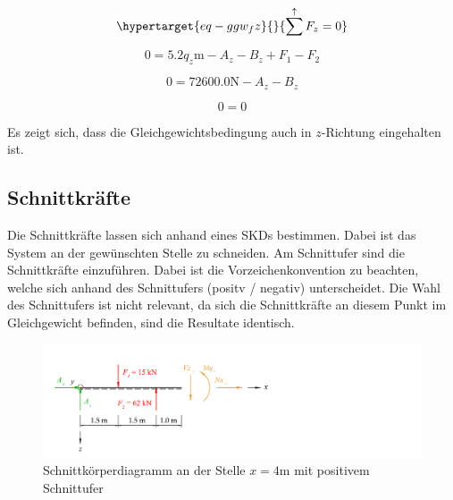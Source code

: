 \documentclass[
  12pt,
  letterpaper,
  DIV=11,
  egregdoesnotlikesansseriftitles]{scrartcl}
\begin{document}
\begin{equation}\protect\hypertarget{eq-ggw_fz}{}{
\sum^\uparrow F_z = 0
}\label{eq-ggw_fz}\end{equation}

\begin{equation}0 = 5.2 q_{z} \text{m} - A_{z} - B_{z} + F_{1} - F_{2}\end{equation}

\begin{equation}0 = 72600.0 \text{N} - A_{z} - B_{z}\end{equation}

\begin{equation}0 = 0\end{equation}

Es zeigt sich, dass die Gleichgewichtsbedingung auch in \(z\)-Richtung
eingehalten ist.

\hypertarget{schnittkruxe4fte}{%
\subsection{Schnittkräfte}\label{schnittkruxe4fte}}

Die Schnittkräfte lassen sich anhand eines SKDs bestimmen. Dabei ist das
System an der gewünschten Stelle zu schneiden. Am Schnittufer sind die
Schnittkräfte einzuführen. Dabei ist die Vorzeichenkonvention zu
beachten, welche sich anhand des Schnittufers (positv / negativ)
unterscheidet. Die Wahl des Schnittufers ist nicht relevant, da sich die
Schnittkräfte an diesem Punkt im Gleichgewicht befinden, sind die
Resultate identisch.

\begin{figure}[H]

{\centering \includegraphics{BSI_HS23_Testat_01_files/mediabag/../images/Testat_01_HS23_SKD_1.pdf}

}

\caption{\label{fig-skd_4_pos}Schnittkörperdiagramm an der Stelle
\(x=4\)m mit positivem Schnittufer}

\end{figure}
\end{document}

